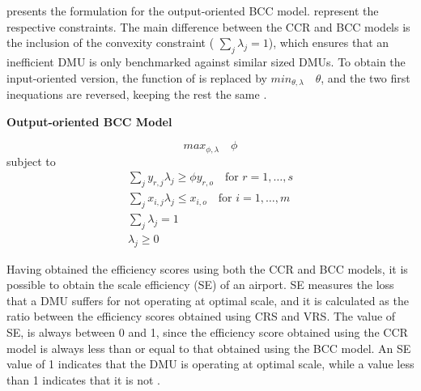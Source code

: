  presents the formulation for the output-oriented BCC model. 
 represent the respective constraints. The main difference between the CCR and BCC models is the inclusion of the convexity constraint ( \(\sum_j \lambda_j = 1\)), which ensures that an inefficient DMU is only benchmarked against similar sized DMUs.
To obtain the input-oriented version, the function of  is replaced by \(min_{\theta,\lambda} \quad \theta\), and the two first inequations are reversed, keeping the rest the same \cite{banker1984}.

\clearpage
\vspace{-0.4cm}
\begin{center}
\textbf{Output-oriented BCC Model}
\end{center}
\begin{equation}
    \label{output_dea}
max_{\phi,\lambda} \quad \phi
\end{equation}
subject to
\begin{equation}
\label{eq:bcc_constraints_output}
\begin{gathered}
\sum_j y_{r,j} \lambda_j \geq \phi y_{r,o} \quad \text{for } r=1,\ldots,s \\
\sum_j x_{i,j}\lambda_j \leq x_{i,o} \quad \text{for } i=1,\ldots,m \\
\sum_j \lambda_j = 1 \\
\lambda_j \geq 0
\end{gathered}
\end{equation}
\vspace{-0.4cm}


Having obtained the efficiency scores using both the CCR and BCC models,
it is possible to obtain the scale efficiency (SE) of an airport. SE measures the loss that a DMU suffers
for not operating at optimal scale, and it is calculated as the ratio between the efficiency scores obtained
using CRS and VRS.
The value of SE, is always between 0 and 1, since the efficiency score obtained using the CCR model is always less than or equal to that obtained using the BCC model. An SE value of 1 indicates that the DMU is operating at optimal scale, while a value less than 1 indicates that it is not \cite{bogetoft2011}.

